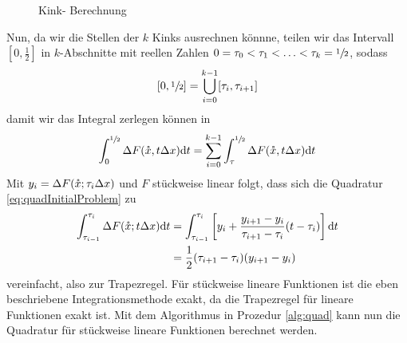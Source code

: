 \begin{figure}
\centering
 
 \caption{Kink- Berechnung}
\label{fig:findingKinks} 
\end{figure}

Nun, da wir die Stellen der $k$ Kinks ausrechnen könnne, teilen wir das Intervall $[0,\frac{1}{2}]$ in $k$-Abschnitte mit reellen Zahlen $0=\tau_0<\tau_1<\ldots<\tau_k = \sfrac{1}{2}$,  sodass
\[
 [0,\sfrac{1}{2}] = \bigcup_{i=0}^{k-1} [\tau_i,\tau_{i+1}]
\]
damit wir das Integral zerlegen können in
\[
 \int_0^{\sfrac{1}{2}} \Delta F(\mathring{x},t\Delta x) \text{d}t = \sum_{i=0}^{k-1} \int_\tau^{\sfrac{1}{2}} \Delta F(\mathring{x},t\Delta x) \text{d}t
\]
Mit $y_i = \Delta F(\mathring{x};\tau_i \Delta x)$ und $F$ stückweise linear folgt, dass sich die Quadratur \ref{eq:quadInitialProblem} zu
\begin{equation}
\begin{aligned}
 \int_{\tau_{i-1}}^{\tau_i} \Delta F(\mathring{x};t\Delta x) \text{d}t &= \int_{\tau_{i-1}}^{\tau_i}\left[ y_i+ \frac{y_{i+1}-y_i}{\tau_{i+1}-\tau_i}(t-\tau_i) \right] \text{d}t \\
 &=\frac{1}{2}(\tau_{i+1} -\tau_i)(y_{i+1}-y_i)
 \end{aligned}
\end{equation}
vereinfacht, also zur Trapezregel. Für stückweise lineare Funktionen ist die eben beschriebene Integrationsmethode exakt, da die Trapezregel für lineare Funktionen exakt ist.
Mit dem Algorithmus in Prozedur \ref{alg:quad} kann nun die Quadratur für stückweise lineare Funktionen berechnet werden. 



